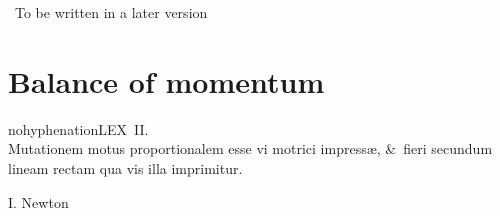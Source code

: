 \documentclass[a4paper,12pt,%
onecolumn,oneside,%
british%
]{memoir}
\newcommand{\langnohyph}[1]{\begin{hyphenrules}{nohyphenation}#1\end{hyphenrules}}
\newcommand*{\amp}{\&}
\newcommand{\mynotew}[1]{{\footnotesize\color{midgrey}\faIcon{tools}\ #1}}
\renewcommand*{\|}[1][]{\nonscript\:#1\vert\nonscript\:\mathopen{}}
\begin{document}
\mynotew{To be written in a later version}


\printpagenotes*
\cleartooddpage
\chapter{Balance of momentum}
\label{cha:bal_momentum}


\epigraph{
\langnohyph{LEX~II.\\
Mutationem motus proportionalem esse vi motrici impress{\ae}, \amp\ fieri secundum lineam rectam qua vis illa imprimitur.}}{I. Newton \cites*{newton1687}}

%
\end{document}
